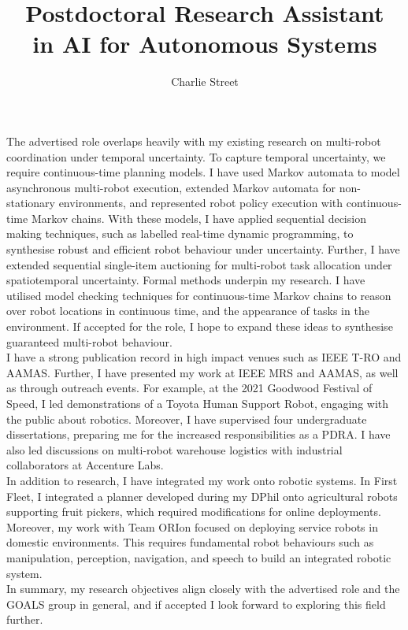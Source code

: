 \documentclass[12pt]{article}
\title{Postdoctoral Research Assistant \\in AI for Autonomous Systems}
\date{}
\author{Charlie Street}
\begin{document}
\maketitle
\thispagestyle{empty}

The advertised role overlaps heavily with my existing research on multi-robot coordination under temporal uncertainty.
%
To capture temporal uncertainty, we require continuous-time planning models.
%
I have used Markov automata to model asynchronous multi-robot execution, extended Markov automata for non-stationary environments, and represented robot policy execution with continuous-time Markov chains.
%
With these models, I have applied sequential decision making techniques, such as labelled real-time dynamic programming, to synthesise robust and efficient robot behaviour under uncertainty.
%
Further, I have extended sequential single-item auctioning for multi-robot task allocation under spatiotemporal uncertainty.
%
Formal methods underpin my research.
%
I have utilised model checking techniques for continuous-time Markov chains to reason over robot locations in continuous time, and the appearance of tasks in the environment.
%
If accepted for the role, I hope to expand these ideas to synthesise guaranteed multi-robot behaviour.\\

I have a strong publication record in high impact venues such as IEEE T-RO and AAMAS.
%
Further, I have presented my work at IEEE MRS and AAMAS, as well as through outreach events.
%
For example, at the 2021 Goodwood Festival of Speed, I led demonstrations of a Toyota Human Support Robot, engaging with the public about robotics.
%
Moreover, I have supervised four undergraduate dissertations, preparing me for the increased responsibilities as a PDRA.
%
I have also led discussions on multi-robot warehouse logistics with industrial collaborators at Accenture Labs.\\

In addition to research, I have integrated my work onto robotic systems.
%
In First Fleet, I integrated a planner developed during my DPhil onto agricultural robots supporting fruit pickers, which required modifications for online deployments.
%
Moreover, my work with Team ORIon focused on deploying service robots in domestic environments.
%
This requires fundamental robot behaviours such as manipulation, perception, navigation, and speech to build an integrated robotic system.\\

In summary, my research objectives align closely with the advertised role and the GOALS group in general, and if accepted I look forward to exploring this field further.
\end{document}
